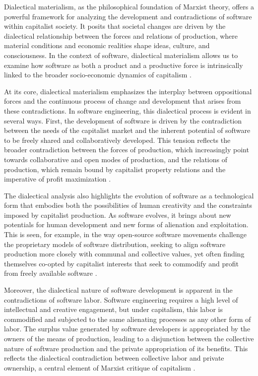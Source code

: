 \begin{refsection}
Dialectical materialism, as the philosophical foundation of Marxist theory, offers a powerful framework for analyzing the development and contradictions of software within capitalist society. It posits that societal changes are driven by the dialectical relationship between the forces and relations of production, where material conditions and economic realities shape ideas, culture, and consciousness. In the context of software, dialectical materialism allows us to examine how software as both a product and a productive force is intrinsically linked to the broader socio-economic dynamics of capitalism \cite[pp.~14-19]{marx2008}.

At its core, dialectical materialism emphasizes the interplay between oppositional forces and the continuous process of change and development that arises from these contradictions. In software engineering, this dialectical process is evident in several ways. First, the development of software is driven by the contradiction between the needs of the capitalist market and the inherent potential of software to be freely shared and collaboratively developed. This tension reflects the broader contradiction between the forces of production, which increasingly point towards collaborative and open modes of production, and the relations of production, which remain bound by capitalist property relations and the imperative of profit maximization \cite[pp.~23-28]{mosco2011}.

The dialectical analysis also highlights the evolution of software as a technological form that embodies both the possibilities of human creativity and the constraints imposed by capitalist production. As software evolves, it brings about new potentials for human development and new forms of alienation and exploitation. This is seen, for example, in the way open-source software movements challenge the proprietary models of software distribution, seeking to align software production more closely with communal and collective values, yet often finding themselves co-opted by capitalist interests that seek to commodify and profit from freely available software \cite[pp.~58-63]{benkler2010}.

Moreover, the dialectical nature of software development is apparent in the contradictions of software labor. Software engineering requires a high level of intellectual and creative engagement, but under capitalism, this labor is commodified and subjected to the same alienating processes as any other form of labor. The surplus value generated by software developers is appropriated by the owners of the means of production, leading to a disjunction between the collective nature of software production and the private appropriation of its benefits. This reflects the dialectical contradiction between collective labor and private ownership, a central element of Marxist critique of capitalism \cite[pp.~42-47]{fuchs2014}.


\end{refsection}
